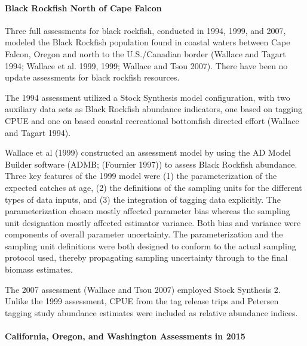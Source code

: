 \documentclass[11pt,
  letterpaper,
]{article}
\begin{document}
\hypertarget{black-rockfish-north-of-cape-falcon}{%
\paragraph{Black Rockfish North of Cape Falcon}\label{black-rockfish-north-of-cape-falcon}}

Three full assessments for black rockfish, conducted in 1994, 1999, and 2007, modeled the Black Rockfish population found in coastal waters between Cape Falcon, Oregon and north to the U.S./Canadian border (Wallace and Tagart 1994; Wallace et al. 1999, 1999; Wallace and Tsou 2007). There have been no update assessments for black rockfish resources.

The 1994 assessment utilized a Stock Synthesis model configuration, with two auxiliary data sets as Black Rockfish abundance indicators, one based on tagging CPUE and one on based coastal recreational bottomfish directed effort (Wallace and Tagart 1994).

Wallace et al (1999) constructed an assessment model by using the AD Model Builder software (ADMB; (Fournier 1997)) to assess Black Rockfish abundance. Three key features of the 1999 model were (1) the parameterization of the expected catches at age, (2) the definitions of the sampling units for the different types of data inputs, and (3) the integration of tagging data explicitly. The parameterization chosen mostly affected parameter bias whereas the sampling unit designation mostly affected estimator variance. Both bias and variance were components of overall parameter uncertainty. The parameterization and the sampling unit definitions were both designed to conform to the actual sampling protocol used, thereby propagating sampling uncertainty through to the final biomass estimates.

The 2007 assessment (Wallace and Tsou 2007) employed Stock Synthesis 2. Unlike the 1999 assessment, CPUE from the tag release trips and Petersen tagging study abundance estimates were included as relative abundance indices.

\hypertarget{california-oregon-and-washington-assessments-in-2015}{%
\paragraph{California, Oregon, and Washington Assessments in 2015}\label{california-oregon-and-washington-assessments-in-2015}}
\end{document}
